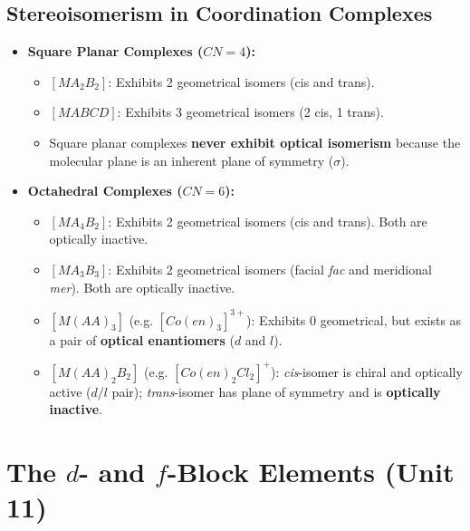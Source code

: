 \documentclass[11pt,a4paper]{article}
\begin{document}
\subsection{Stereoisomerism in Coordination Complexes}

\begin{usecasebox}
\begin{itemize}
  \item \textbf{Square Planar Complexes ($CN=4$):}
  \begin{itemize}
    \item $[MA_2B_2]$: Exhibits 2 geometrical isomers (cis and trans).
    \item $[MABCD]$: Exhibits 3 geometrical isomers (2 cis, 1 trans).
    \item Square planar complexes \textbf{never exhibit optical isomerism} because the molecular plane is an inherent plane of symmetry ($\sigma$).
  \end{itemize}
  \item \textbf{Octahedral Complexes ($CN=6$):}
  \begin{itemize}
    \item $[MA_4B_2]$: Exhibits 2 geometrical isomers (cis and trans). Both are optically inactive.
    \item $[MA_3B_3]$: Exhibits 2 geometrical isomers (facial \textit{fac} and meridional \textit{mer}). Both are optically inactive.
    \item $[M(AA)_3]$ (e.g. $[Co(en)_3]^{3+}$): Exhibits 0 geometrical, but exists as a pair of \textbf{optical enantiomers} ($d$ and $l$).
    \item $[M(AA)_2B_2]$ (e.g. $[Co(en)_2Cl_2]^+$): \textit{cis}-isomer is chiral and optically active ($d/l$ pair); \textit{trans}-isomer has plane of symmetry and is \textbf{optically inactive}.
  \end{itemize}
\end{itemize}
\end{usecasebox}

\newpage

\section{The $d$- and $f$-Block Elements (Unit 11)}
\end{document}
